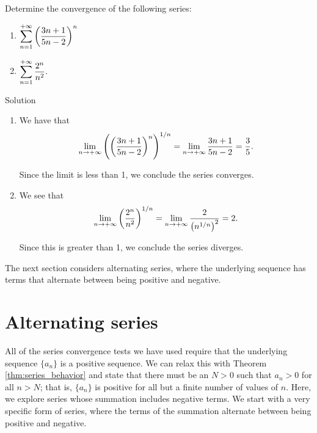 \fi

\begin{example}\label{ex_root1}
Determine the convergence of the following series:\\

\begin{multicols}{2}
\begin{enumerate}
    \item $\displaystyle\sum_{n=1}^{+\infty} \left(\frac{3n+1}{5n-2}\right)^n$
    \item $\displaystyle\sum_{n=1}^{+\infty} \frac{2^n}{n^2}.$
\end{enumerate}
\end{multicols}

\pagebreak
{}Solution 

\begin{enumerate}
	\item We have that 
	$$\displaystyle\lim_{n\to+\infty} \left(\left(\frac{3n+1}{5n-2}\right)^n\right)^{1/n} = \lim_{n\to+\infty} \frac{3n+1}{5n-2} = \frac 35.$$ 
	
	Since the limit is less than 1, we conclude the series converges. 
	
	
	\item	We see that
	$$\displaystyle \lim_{n\to+\infty} \left(\frac{2^n}{n^2}\right)^{1/n} = \lim_{n\to+\infty} \frac{2}{\big(n^{1/n}\big)^2} = 2.$$ 
	
	Since this is greater than 1, we conclude the series diverges.
\end{enumerate}
\end{example}

 The next section considers alternating series, where the underlying sequence has terms that alternate between being positive and negative.


\section{Alternating series}\label{sec:alt_series}


All of the series convergence tests we have used require that the underlying sequence $\{a_n\}$ is a positive sequence. We can relax this with Theorem \ref{thm:series_behavior} and state that there must be an $N>0$ such that $a_n>0$ for all $n>N$; that is, $\{a_n\}$ is positive for all but a finite number of values of $n$. Here, we explore series whose summation includes negative terms. We start with a very specific form of series, where the terms of the summation alternate between being positive and negative.

